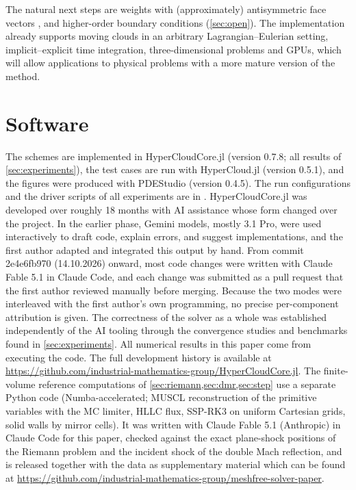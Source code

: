 \documentclass[11pt,a4paper]{article}
\numberwithin{equation}{section}
\begin{document}
The natural next steps are weights with (approximately) antisymmetric face vectors \cite{Chiu2012,Suchde2017}, and higher-order boundary conditions (\cref{sec:open}). The implementation \cite{jung_hypercloudcore,jung_hypercloud} already supports moving clouds in an arbitrary Lagrangian--Eulerian setting, implicit--explicit time integration, three-dimensional problems and GPUs, which will allow applications to physical problems with a more mature version of the method.

\section*{Software}
The schemes are implemented in HyperCloudCore.jl \cite{jung_hypercloudcore} (version 0.7.8; all results of \cref{sec:experiments}), the test cases are run with HyperCloud.jl \cite{jung_hypercloud} (version 0.5.1), and the figures were produced with PDEStudio \cite{jung_pdestudio} (version 0.4.5). The run configurations and the driver scripts of all experiments are in \cite{jung_meshfree_simulations}.
HyperCloudCore.jl was developed over roughly 18 months with AI assistance whose form changed over the project. In the earlier phase, Gemini models, mostly 3.1 Pro, were used interactively to draft code, explain errors, and suggest implementations, and the first author adapted and integrated this output by hand. From commit 2e4e6fb970 (14.10.2026) onward, most code changes were written with Claude Fable 5.1 in Claude Code, and each change was submitted as a pull request that the first author reviewed manually before merging. Because the two modes were interleaved with the first author's own programming, no precise per-component attribution is given. The correctness of the solver as a whole was established independently of the AI tooling through the convergence studies and benchmarks found in \cref{sec:experiments}. All numerical results in this paper come from executing the code. The full development history is available at \url{https://github.com/industrial-mathematics-group/HyperCloudCore.jl}.
The finite-volume reference computations of \cref{sec:riemann,sec:dmr,sec:step} use a separate Python code (Numba-accelerated; MUSCL reconstruction of the primitive variables with the MC limiter, HLLC flux, SSP-RK3 on uniform Cartesian grids, solid walls by mirror cells). It was written with Claude Fable 5.1 (Anthropic) in Claude Code for this paper, checked against the exact plane-shock positions of the Riemann problem and the incident shock of the double Mach reflection, and is released together with the data as supplementary material which can be found at \url{https://github.com/industrial-mathematics-group/meshfree-solver-paper}.
\appendix
\end{document}
